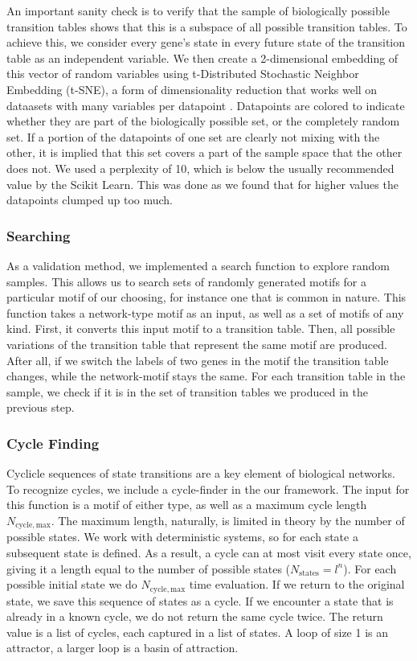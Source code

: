 \documentclass[../main.tex]{subfiles}
\begin{document}
An important sanity check is to verify that the sample of biologically possible transition tables shows that this is a subspace of all possible transition tables.
To achieve this, we consider every gene's state in every future state of the transition table as an independent variable.
We then create a 2-dimensional embedding of this vector of random variables using t-Distributed Stochastic Neighbor Embedding (t-SNE), a form of dimensionality reduction that works well on dataasets with many variables per datapoint \cite{maaten2008visualizing}.
Datapoints are colored to indicate whether they are part of the biologically possible set, or the completely random set.
If a portion of the datapoints of one set are clearly not mixing with the other, it is implied that this set covers a part of the sample space that the other does not.
We used a perplexity of 10, which is below the usually recommended value by the Scikit Learn.
This was done as we found that for higher values the datapoints clumped up too much.

\subsubsection{Searching}

As a validation method, we implemented a search function to explore random samples.
This allows us to search sets of randomly generated motifs for a particular motif of our choosing, for instance one that is common in nature.
This function takes a network-type motif as an input, as well as a set of motifs of any kind.
First, it converts this input motif to a transition table.
Then, all possible variations of the transition table that represent the same motif are produced.
After all, if we switch the labels of two genes in the motif the transition table changes, while the network-motif stays the same.
For each transition table in the sample, we check if it is in the set of transition tables we produced in the previous step.

\subsubsection{Cycle Finding}

Cyclicle sequences of state transitions are a key element of biological networks. %
To recognize cycles, we include a cycle-finder in the our framework.
The input for this function is a motif of either type, as well as a maximum cycle length $N_\mathrm{cycle,max}$.
The maximum length, naturally, is limited in theory by the number of possible states.
We work with deterministic systems, so for each state a subsequent state is defined.
As a result, a cycle can at most visit every state once, giving it a length equal to the number of possible states ($N_\mathrm{states} = l^n$).
For each possible initial state we do $N_\mathrm{cycle,max}$ time evaluation.
If we return to the original state, we save this sequence of states as a cycle.
If we encounter a state that is already in a known cycle, we do not return the same cycle twice.
The return value is a list of cycles, each captured in a list of states.
A loop of size 1 is an attractor, a larger loop is a basin of attraction.
\end{document}
